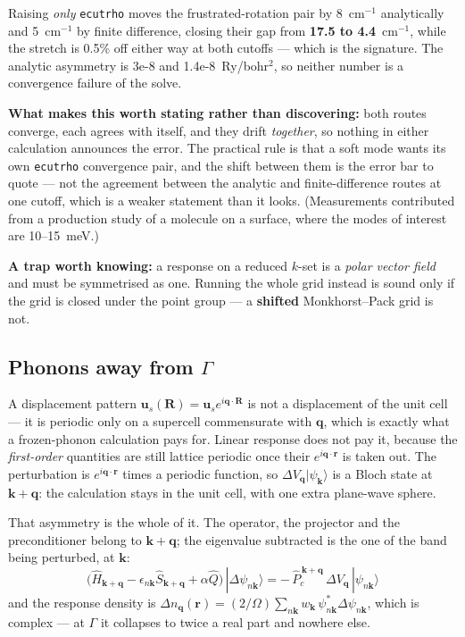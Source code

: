 \documentclass[11pt,a4paper]{article}
\newcommand{\code}[1]{\texttt{\small #1}}
\begin{document}
\noindent Raising \emph{only} \code{ecutrho} moves the frustrated-rotation pair
by 8~cm$^{-1}$ analytically and 5~cm$^{-1}$ by finite difference, closing their
gap from \textbf{17.5 to 4.4}~cm$^{-1}$, while the stretch is 0.5\% off either
way at both cutoffs --- which is the signature. The analytic asymmetry is 3e-8
and 1.4e-8~Ry/bohr$^2$, so neither number is a convergence failure of the solve.

\textbf{What makes this worth stating rather than discovering:} both routes
converge, each agrees with itself, and they drift \emph{together}, so nothing in
either calculation announces the error. The practical rule is that a soft mode
wants its own \code{ecutrho} convergence pair, and the shift between them is the
error bar to quote --- not the agreement between the analytic and
finite-difference routes at one cutoff, which is a weaker statement than it
looks. (Measurements contributed from a production study of a molecule on a
surface, where the modes of interest are 10--15~meV.)

\textbf{A trap worth knowing:} a response on a reduced $k$-set is a \emph{polar
vector field} and must be symmetrised as one. Running the whole grid instead is
sound only if the grid is closed under the point group --- a \textbf{shifted}
Monkhorst--Pack grid is not.

\subsection{Phonons away from $\Gamma$}

A displacement pattern $\mathbf u_s(\mathbf R) = \mathbf u_s e^{i\mathbf q\cdot\mathbf R}$
is not a displacement of the unit cell --- it is periodic only on a supercell
commensurate with $\mathbf q$, which is exactly what a frozen-phonon calculation
pays for. Linear response does not pay it, because the \emph{first-order}
quantities are still lattice periodic once their $e^{i\mathbf q\cdot\mathbf r}$
is taken out. The perturbation is $e^{i\mathbf q\cdot\mathbf r}$ times a
periodic function, so $\Delta V_{\mathbf q}|\psi_{\mathbf k}\rangle$ is a Bloch
state at $\mathbf k + \mathbf q$: the calculation stays in the unit cell, with
one extra plane-wave sphere.

That asymmetry is the whole of it. The operator, the projector and the
preconditioner belong to $\mathbf k+\mathbf q$; the eigenvalue subtracted is the
one of the band being perturbed, at $\mathbf k$:
\begin{equation*}
\big(\hat H_{\mathbf k+\mathbf q} - \epsilon_{n\mathbf k}\hat S_{\mathbf k+\mathbf q}
   + \alpha\hat Q\big)\,|\Delta\psi_{n\mathbf k}\rangle
 = -\,\hat P_c^{\,\mathbf k+\mathbf q}\,\Delta V_{\mathbf q}\,|\psi_{n\mathbf k}\rangle
\end{equation*}
and the response density is $\Delta n_{\mathbf q}(\mathbf r) = (2/\Omega)\sum_{n\mathbf k}
w_{\mathbf k}\,\psi^{*}_{n\mathbf k}\Delta\psi_{n\mathbf k}$, which is complex ---
at $\Gamma$ it collapses to twice a real part and nowhere else.
\end{document}
